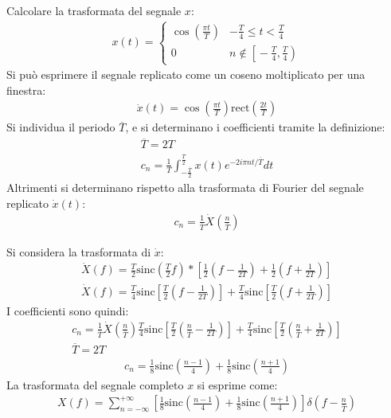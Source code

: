 \documentclass{article}
\begin{document}
Calcolare la trasformata del segnale $x$:
\begin{gather*}
    x(t)=\begin{cases}
        \cos\displaystyle\left(\frac{\pi t}{T}\right) &-\displaystyle\frac{T}{4}\leq t<\frac{T}{4}\\
        0&n\notin\left[\right.\displaystyle-\frac{T}{4},\frac{T}{4}\left.\right)
    \end{cases}
\end{gather*}
Si può esprimere il segnale replicato come un coseno moltiplicato per una finestra:
\begin{gather*}
    \dot x(t)=\cos\displaystyle\left(\frac{\pi t}{T}\right)\mbox{rect}\left(\frac{2t}{T}\right)
\end{gather*}
Si individua il periodo $\overline{T}$, e si determinano i coefficienti tramite la definizione:
\begin{gather*}
    \overline{T}=2T\\
    c_n=\displaystyle\frac{1}{T}\int_{-\frac{\overline{T}}{2}}^{\frac{\overline{T}}{2}}x(t)e^{-2i\pi nt/\overline{T}}dt
\end{gather*}
Altrimenti si determinano rispetto alla trasformata di Fourier del segnale replicato $\dot x(t)$:
\begin{gather*}
    c_n=\displaystyle\frac{1}{\overline{T}}\dot X\left(\frac{n}{\overline{T}}\right)
\end{gather*}

Si considera la trasformata di $\dot x$:
\begin{gather*}
    \dot X(f)=\displaystyle\frac{T}{2}\mbox{sinc}\left(\frac{T}{2}f\right)*\left[\frac{1}{2}\left(f-\frac{1}{2T}\right)+\frac{1}{2}\left(f+\frac{1}{2T}\right)\right]\\
    \dot X(f)=\displaystyle\frac{T}{4}\mbox{sinc}\left[\frac{T}{2}\left(f-\frac{1}{2T}\right)\right]+\frac{T}{4}\mbox{sinc}\left[\frac{T}{2}\left(f+\frac{1}{2T}\right)\right]
\end{gather*}
I coefficienti sono quindi:
\begin{gather*}
    c_n=\frac{1}{\overline{T}}\dot X\left(\frac{n}{\overline{T}}\right)\frac{T}{4}\mbox{sinc}\left[\frac{T}{2}\left(\frac{n}{\overline{T}}-\frac{1}{2T}\right)\right]+\frac{T}{4}\mbox{sinc}\left[\frac{T}{2}\left(\frac{n}{\overline{T}}+\frac{1}{2T}\right)\right]\\
    \overline{T}=2T
\end{gather*}
\begin{gather}
    c_n=\displaystyle\frac{1}{8}\mbox{sinc}\left(\frac{n-1}{4}\right)+\frac{1}{8}\mbox{sinc}\left(\frac{n+1}{4}\right)
\end{gather}
La trasformata del segnale completo $x$ si esprime come:
\begin{gather}
    X(f)=\displaystyle\sum_{n=-\infty}^{+\infty}\left[\frac{1}{8}\mbox{sinc}\left(\frac{n-1}{4}\right)+\frac{1}{8}\mbox{sinc}\left(\frac{n+1}{4}\right)\right]\delta\left(f-\frac{n}{\overline{T}}\right)
\end{gather}
\end{document}
